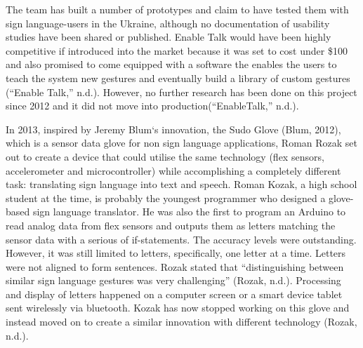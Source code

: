 The team has built a number of prototypes and claim to have tested them with sign language-users in the Ukraine, although no documentation of usability studies have been shared or published. Enable Talk would have been highly competitive if introduced into the market because it was set to cost under \$100 and also promised to come equipped with a software the enables the users to teach the system new gestures and eventually build a library of custom gestures (``Enable Talk,'' n.d.). However, no further research has been done on this project since 2012 and it did not move into production(``EnableTalk,'' n.d.). 

In 2013, inspired by Jeremy Blum‘s innovation, the Sudo Glove (Blum, 2012), which is a sensor data glove for non sign language applications, Roman Rozak set out to create a device that could utilise the same technology (flex sensors, accelerometer and microcontroller) while accomplishing a completely different task: translating sign language into text and speech. Roman Kozak, a high school student at the time, is probably the youngest programmer who designed a glove-based sign language translator. He was also the first to program an Arduino to read analog data from flex sensors and outputs them as letters matching the sensor data with a serious of if-statements. The accuracy levels were outstanding. However, it was still limited to letters, specifically, one letter at a time. Letters were not aligned to form sentences. Rozak stated that ``distinguishing between similar sign language gestures was very challenging'' (Rozak, n.d.). Processing and display of letters happened on a computer screen or a smart device tablet sent wirelessly via bluetooth. Kozak has now stopped working on this glove and instead moved on to create a similar innovation with different technology (Rozak, n.d.).


